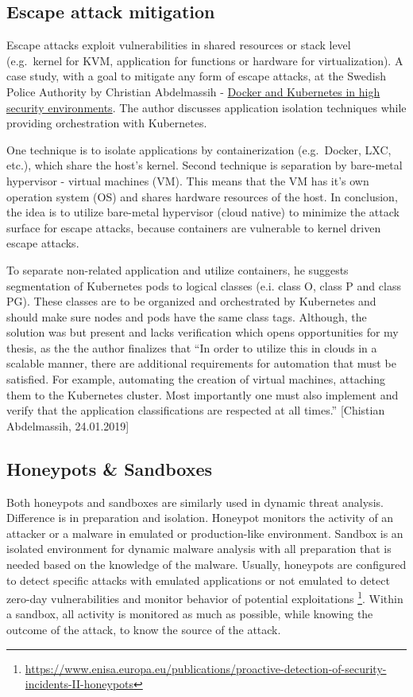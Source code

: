 \documentclass[12pt,a4paper,twoside]{report}
\begin{document}
\subsection{Escape attack mitigation}\label{escape-attack-mitigation}

Escape attacks exploit vulnerabilities in shared resources or stack
level (e.g.~kernel for KVM, application for functions or hardware for
virtualization). A case study, with a goal to mitigate any form of
escape attacks, at the Swedish Police Authority by Christian Abdelmassih
-
\href{https://medium.com/@chrismessiah/docker-and-kubernetes-in-high-security-environments-d851645e8b99}{Docker
and Kubernetes in high security environments}. The author discusses
application isolation techniques while providing orchestration with
Kubernetes.

One technique is to isolate applications by containerization
(e.g.~Docker, LXC, etc.), which share the host's kernel. Second
technique is separation by bare-metal hypervisor - virtual machines
(VM). This means that the VM has it's own operation system (OS) and
shares hardware resources of the host. In conclusion, the idea is to
utilize bare-metal hypervisor (cloud native) to minimize the attack
surface for escape attacks, because containers are vulnerable to kernel
driven escape attacks.

To separate non-related application and utilize containers, he suggests
segmentation of Kubernetes pods to logical classes (e.i. class O, class
P and class PG). These classes are to be organized and orchestrated by
Kubernetes and should make sure nodes and pods have the same class tags.
Although, the solution was but present and lacks verification which
opens opportunities for my thesis, as the the author finalizes that ``In
order to utilize this in clouds in a scalable manner, there are
additional requirements for automation that must be satisfied. For
example, automating the creation of virtual machines, attaching them to
the Kubernetes cluster. Most importantly one must also implement and
verify that the application classifications are respected at all
times.'' {[}Chistian Abdelmassih, 24.01.2019{]}

\subsection{Honeypots \& Sandboxes}\label{honeypots-sandboxes}

Both honeypots and sandboxes are similarly used in dynamic threat
analysis. Difference is in preparation and isolation. Honeypot monitors
the activity of an attacker or a malware in emulated or production-like
environment. Sandbox is an isolated environment for dynamic malware
analysis with all preparation that is needed based on the knowledge of
the malware. Usually, honeypots are configured to detect specific
attacks with emulated applications or not emulated to detect zero-day
vulnerabilities and monitor behavior of potential exploitations
\footnote{\url{https://www.enisa.europa.eu/publications/proactive-detection-of-security-incidents-II-honeypots}}.
Within a sandbox, all activity is monitored as much as possible, while
knowing the outcome of the attack, to know the source of the attack.
\end{document}
